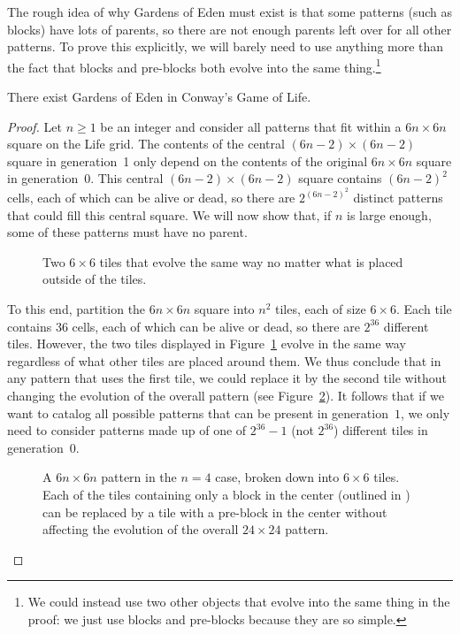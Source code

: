 The rough idea of why Gardens of Eden must exist is that some patterns (such as blocks) have lots of parents, so there are not enough parents left over for all other patterns. To prove this explicitly, we will barely need to use anything more than the fact that blocks and pre-blocks both evolve into the same thing.\footnote{We could instead use two other objects that evolve into the same thing in the proof: we just use blocks and pre-blocks because they are so simple.}	

\begin{theorem}\label{thm:garden_of_eden_exists}
	There exist Gardens of Eden in Conway's Game of Life.
\end{theorem}

\begin{proof}
	Let $n \geq 1$ be an integer and consider all patterns that fit within a $6n \times 6n$ square on the Life grid. The contents of the central $(6n-2) \times (6n-2)$ square in generation~1 only depend on the contents of the original $6n \times 6n$ square in generation~0. This central $(6n-2) \times (6n-2)$ square contains $(6n-2)^2$ cells, each of which can be alive or dead, so there are $2^{(6n-2)^2}$ distinct patterns that could fill this central square. We will now show that, if $n$ is large enough, some of these patterns must have no parent.
	
	\begin{figure}[!htb]
		\centering{}
		\caption{Two $6 \times 6$ tiles that evolve the same way no matter what is placed outside of the tiles.}\label{fig:goe_theorem_tiles}
	\end{figure}
	
	To this end, partition the $6n \times 6n$ square into $n^2$ tiles, each of size $6 \times 6$. Each tile contains $36$ cells, each of which can be alive or dead, so there are $2^{36}$ different tiles. However, the two tiles displayed in Figure~\ref{fig:goe_theorem_tiles} evolve in the same way regardless of what other tiles are placed around them. We thus conclude that in any pattern that uses the first tile, we could replace it by the second tile without changing the evolution of the overall pattern (see Figure~\ref{fig:goe_theorem_tiles_example}). It follows that if we want to catalog all possible patterns that can be present in generation~$1$, we only need to consider patterns made up of one of $2^{36} - 1$ (not $2^{36}$) different tiles in generation~$0$.
	
	\begin{figure}[!htb]
		\centering{}
		\caption{A $6n \times 6n$ pattern in the $n = 4$ case, broken down into $6 \times 6$ tiles. Each of the tiles containing only a block in the center (outlined in ) can be replaced by a tile with a pre-block in the center without affecting the evolution of the overall $24 \times 24$ pattern.}\label{fig:goe_theorem_tiles_example}
	\end{figure}
	

\end{proof}
